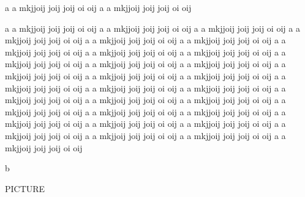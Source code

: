 \documentclass[12pt,letterpaper,twoside,twocolumn,draft,showtrims]{memoir} %
\begin{document}
\newpage
a a mkjjoij  joij joij oi  oij 
a a mkjjoij  joij joij oi  oij 

a a mkjjoij  joij joij oi  oij 
a a mkjjoij  joij joij oi  oij 
a a mkjjoij  joij joij oi  oij 
a a mkjjoij  joij joij oi  oij 
a a mkjjoij  joij joij oi  oij 
a a mkjjoij  joij joij oi  oij 
a a mkjjoij  joij joij oi  oij 
a a mkjjoij  joij joij oi  oij 
a a mkjjoij  joij joij oi  oij 
a a mkjjoij  joij joij oi  oij 
a a mkjjoij  joij joij oi  oij 
a a mkjjoij  joij joij oi  oij 
a a mkjjoij  joij joij oi  oij 
a a mkjjoij  joij joij oi  oij 
a a mkjjoij  joij joij oi  oij 
a a mkjjoij  joij joij oi  oij 
a a mkjjoij  joij joij oi  oij 
a a mkjjoij  joij joij oi  oij 
a a mkjjoij  joij joij oi  oij 
a a mkjjoij  joij joij oi  oij 
a a mkjjoij  joij joij oi  oij 
a a mkjjoij  joij joij oi  oij 
a a mkjjoij  joij joij oi  oij 
a a mkjjoij  joij joij oi  oij 
a a mkjjoij  joij joij oi  oij 
a a mkjjoij  joij joij oi  oij 
a a mkjjoij  joij joij oi  oij 
a a mkjjoij  joij joij oi  oij 
a a mkjjoij  joij joij oi  oij 
a a mkjjoij  joij joij oi  oij 
a a mkjjoij  joij joij oi  oij 


\newpage
b
\newpage

PICTURE
\end{document}
